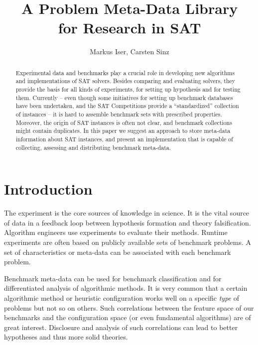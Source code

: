 \documentclass{easychair}
\title{A Problem Meta-Data Library\\for Research in SAT}
\author{Markus Iser, Carsten Sinz}
\institute{Institute for Theoretical Informatics (ITI) \\ Karlsruhe Institute of Technology (KIT) \\
  Karlsruhe, Germany}
\begin{document}
\maketitle

\begin{abstract}
Experimental data and benchmarks play a crucial role in developing new algorithms and implementations
of SAT solvers. Besides comparing and evaluating solvers, they provide the basis for all kinds of experiments,
for setting up hypothesis and for testing them.
Currently -- even though some initiatives for setting up benchmark databases have been undertaken, and
the SAT Competitions provide a ``standardized'' collection of instances --
it is hard to assemble benchmark sets with prescribed properties. Moreover, the origin of SAT instances
is often not clear, and benchmark collections might contain duplicates.
In this paper we suggest an approach to store meta-data information about SAT instances, and present
an implementation that is capable of collecting, assessing and distributing benchmark meta-data.
 
\end{abstract}

\section{Introduction}

The experiment is the core sources of knowledge in science. It is the vital source of data in a feedback loop between hypothesis formation and theory falsification. Algorithm engineers use experiments to evaluate their methods. Runtime experiments are often based on publicly available sets of benchmark problems. A set of characteristics or meta-data can be associated with each benchmark problem.

Benchmark meta-data can be used for benchmark classification and for differentiated analysis of algorithmic methods. It is very common that a certain algorithmic method or heuristic configuration works well on a specific \emph{type} of problems but not so on others. Such correlations between the feature space of our benchmarks and the configuration space (or even fundamental algorithms) are of great interest. Disclosure and analysis of such correlations can lead to better hypotheses and thus more solid theories.
\end{document}
